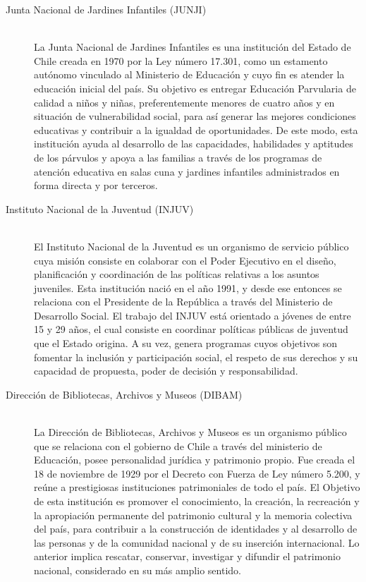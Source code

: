 \begin{description}
\item[Junta Nacional de Jardines Infantiles (JUNJI)] \hfill \\
La Junta Nacional de Jardines Infantiles es una institución del Estado de Chile creada en 1970 por la Ley número 17.301, como un estamento autónomo vinculado al Ministerio de Educación y cuyo fin es atender la educación inicial del país.
Su objetivo es entregar Educación Parvularia de calidad a niños y niñas, preferentemente menores de cuatro años y en situación de vulnerabilidad social, para así generar las mejores condiciones educativas y contribuir a la igualdad de oportunidades. De este modo, esta institución ayuda al desarrollo de las capacidades, habilidades y aptitudes de los párvulos y apoya a las familias a través de los programas de atención educativa en salas cuna y jardines infantiles administrados en forma directa y por terceros.\cite{junji}
\item[Instituto Nacional de la Juventud (INJUV)] \hfill \\
El Instituto Nacional de la Juventud es un organismo de servicio público cuya misión consiste en colaborar con el Poder Ejecutivo en el diseño, planificación y coordinación de las políticas relativas a los asuntos juveniles.
Esta institución nació en el año 1991, y desde ese entonces se relaciona con el Presidente de la República a través del Ministerio de Desarrollo Social.
El trabajo del INJUV está orientado a jóvenes de entre 15 y 29 años, el cual consiste en coordinar políticas públicas de juventud que el Estado origina. A su vez, genera programas cuyos objetivos son fomentar la inclusión y participación social, el respeto de sus derechos y su capacidad de propuesta, poder de decisión y responsabilidad. \cite{injuv} \newpage
\item[Dirección de Bibliotecas, Archivos y Museos (DIBAM)] \hfill \\
La Dirección de Bibliotecas, Archivos y Museos es un organismo público que se relaciona con el gobierno de Chile a través del ministerio de Educación, posee personalidad jurídica y patrimonio propio.
Fue creada el 18 de noviembre de 1929 por el Decreto con Fuerza de Ley número 5.200, y reúne a prestigiosas instituciones patrimoniales de todo el país. 
El Objetivo de esta institución es promover el conocimiento, la creación, la recreación y la apropiación permanente del patrimonio cultural y la memoria colectiva del país, para contribuir a la construcción de identidades y al desarrollo de las personas y de la comunidad nacional y de su inserción internacional. Lo anterior implica rescatar, conservar, investigar y difundir el patrimonio nacional, considerado en su más amplio sentido.\cite{dibam}
\end{description}

